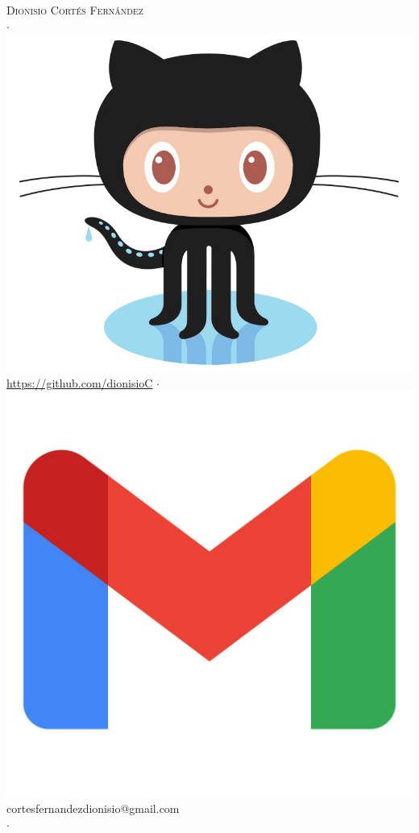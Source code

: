 \documentclass[a4paper]{article}
\begin{document}
\vspace*{-40pt}

\vspace*{-10pt}
\begin{center}
	{\Huge \scshape {Dionisio Cort\'es Fern\'andez}}\\
	$\cdot$ hics[totalheight=0.4cm]{images/Octocat} \url{https://github.com/dionisioC} $\cdot$ \includegraphics[totalheight=0.4cm]{images/gmail} cortesfernandezdionisio@gmail.com\\$\cdot$ \includegrap
\end{center}
\end{document}
